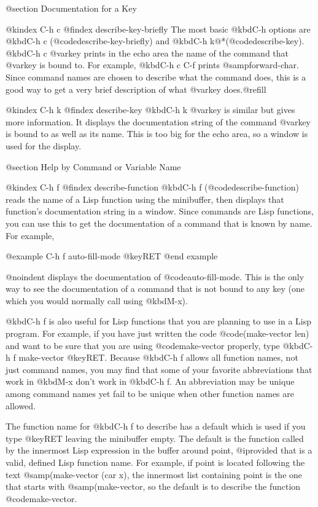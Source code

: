 {{{{{{@section Documentation for a Key

@kindex C-h c
@findex describe-key-briefly
  The most basic @kbd{C-h} options are @kbd{C-h c}
(@code{describe-key-briefly}) and @kbd{C-h k}@*(@code{describe-key}).
@kbd{C-h c @var{key}} prints in the echo area the name of the command that
@var{key} is bound to.  For example, @kbd{C-h c C-f} prints
@samp{forward-char}.  Since command names are chosen to describe what the
command does, this is a good way to get a very brief description of what
@var{key} does.@refill

@kindex C-h k
@findex describe-key
  @kbd{C-h k @var{key}} is similar but gives more information.  It displays
the documentation string of the command @var{key} is bound to as well as
its name.  This is too big for the echo area, so a window is used for the
display.

@section Help by Command or Variable Name

@kindex C-h f
@findex describe-function
  @kbd{C-h f} (@code{describe-function}) reads the name of a Lisp function
using the minibuffer, then displays that function's documentation string
in a window.  Since commands are Lisp functions, you can use this to get
the documentation of a command that is known by name.  For example,

@example
C-h f auto-fill-mode @key{RET}
@end example

@noindent
displays the documentation of @code{auto-fill-mode}.  This is the only
way to see the documentation of a command that is not bound to any key
(one which you would normally call using @kbd{M-x}).

  @kbd{C-h f} is also useful for Lisp functions that you are planning to
use in a Lisp program.  For example, if you have just written the code
@code{(make-vector len)} and want to be sure that you are using
@code{make-vector} properly, type @kbd{C-h f make-vector @key{RET}}.  Because
@kbd{C-h f} allows all function names, not just command names, you may find
that some of your favorite abbreviations that work in @kbd{M-x} don't work
in @kbd{C-h f}.  An abbreviation may be unique among command names yet fail
to be unique when other function names are allowed.

  The function name for @kbd{C-h f} to describe has a default which is
used if you type @key{RET} leaving the minibuffer empty.  The default is
the function called by the innermost Lisp expression in the buffer around
point, @i{provided} that is a valid, defined Lisp function name.  For
example, if point is located following the text @samp{(make-vector (car
x)}, the innermost list containing point is the one that starts with
@samp{(make-vector}, so the default is to describe the function
@code{make-vector}.

}}}}}}
